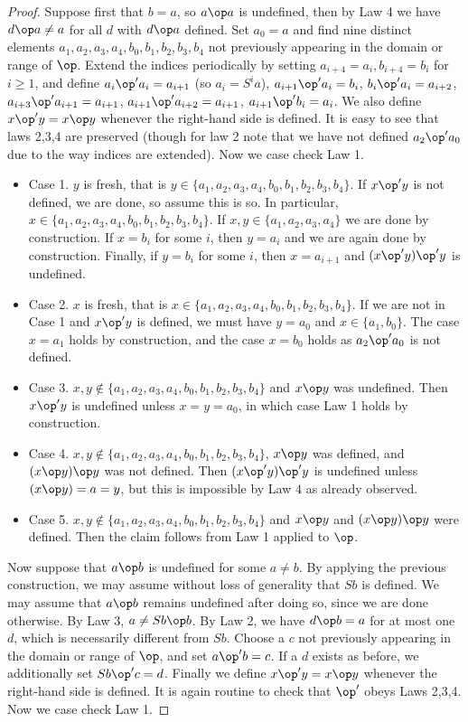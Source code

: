 \begin{proof}  Suppose first that $b=a$, so $a \op a$ is undefined, then by Law 4 we have $d \op a \neq a$ for all $d$ with $d \op a$ defined. Set $a_0=a$ and find nine distinct elements $a_1,a_2,a_3,a_4,b_0,b_1,b_2,b_3,b_4$ not previously appearing in the domain or range of $\op$. Extend the indices periodically by setting $a_{i+4} = a_i,b_{i+4} = b_i$ for $i \ge 1$, and define $a_i \op' a_i = a_{i+1}$ (so $a_i = S^i a$), $a_{i+1} \op' a_i = b_i$, $b_i \op' a_i = a_{i+2}$, $a_{i+3} \op' a_{i+1} = a_{i+1}$, $a_{i+1} \op' a_{i+2} = a_{i+1}$, $a_{i+1} \op' b_i = a_i$.  We also define $x \op' y = x \op y$ whenever the right-hand side is defined. It is easy to see that laws 2,3,4 are preserved (though for law 2 note that we have not defined $a_2 \op' a_0$ due to the way indices are extended). Now we case check Law 1.  \begin{itemize}
    \item Case 1. $y$ is fresh, that is $y \in \{a_1,a_2,a_3,a_4,b_0,b_1,b_2,b_3,b_4\}$. If $x \op' y$ is not defined, we are done, so assume this is so. In particular, $x  \in \{a_1,a_2,a_3,a_4,b_0,b_1,b_2,b_3,b_4\}$. If $x,y \in \{a_1,a_2,a_3,a_4\}$ we are done by construction. If $x = b_i$ for some $i$, then $y = a_i$ and we are again done by construction. Finally, if $y = b_i$ for some $i$, then $x = a_{i+1}$ and $(x \op' y) \op' y$ is undefined.
    \item Case 2. $x$ is fresh, that is $x \in \{a_1,a_2,a_3,a_4,b_0,b_1,b_2,b_3,b_4\}$. If we are not in Case 1 and $x \op' y$ is defined, we must have $y = a_0$ and $x \in \{a_1, b_0\}$. The case $x = a_1$ holds by construction, and the case $x = b_0$ holds as $a_2 \op' a_0$ is not defined.
    \item Case 3. $x,y \not \in  \{a_1,a_2,a_3,a_4,b_0,b_1,b_2,b_3,b_4\}$ and $x \op y$ was undefined. Then $x \op' y$ is undefined unless $x=y=a_0$, in which case Law 1 holds by construction.
    \item Case 4. $x,y \not \in  \{a_1,a_2,a_3,a_4,b_0,b_1,b_2,b_3,b_4\}$, $x \op y$ was defined, and $(x \op y) \op y$ was not defined. Then $(x \op' y) \op' y$ is undefined unless $(x \op y) = a = y$, but this is impossible by Law $4$ as already observed.
    \item Case 5. $x,y \not \in  \{a_1,a_2,a_3,a_4,b_0,b_1,b_2,b_3,b_4\}$ and $x \op y$ and $(x \op y) \op y$ were defined. Then the claim follows from Law 1 applied to $\op$.
\end{itemize}

Now suppose that $a \op b$ is undefined for some $a \neq b$.  By applying the previous construction, we may assume without loss of generality that $Sb$ is defined.  We may assume that $a \op b$ remains undefined after doing so, since we are done otherwise.  By Law 3, $a \neq Sb \op b$.  By Law 2, we have $d \op b = a$ for at most one $d$, which is necessarily different from $Sb$.  Choose a $c$ not previously appearing in the domain or range of $\op$, and set $a \op' b = c$.  If a $d$ exists as before, we additionally set $Sb \op' c = d$.  Finally we define $x \op' y = x \op y$ whenever the right-hand side is defined.
It is again routine to check that $\op'$ obeys Laws 2,3,4.  Now we case check Law 1.


\end{proof}
